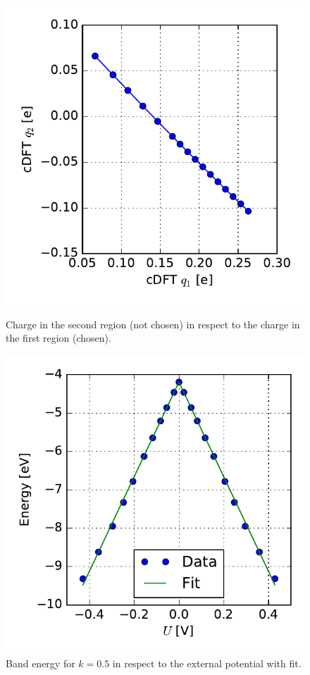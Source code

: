 \begin{figure}
	\centering
	\begin{minipage}{0.49\textwidth}
		\centering
			\includegraphics[width = \textwidth]{Images/Hydrogen/charging/charge_correlation}
			\caption{Charge in the second region (not chosen) in respect to the charge in the first region (chosen).}
			\label{image_charge_correlation}
	
	\end{minipage}\hspace*{.5cm}
	\begin{minipage}{0.49\textwidth}
	\centering
	\includegraphics[width = \textwidth]{Images/Hydrogen/charging/border_energy_q_1}
	\caption{Band energy for $k = 0.5$ in respect to the external potential with fit.}
	\label{image_edge_energy_qs_1}
	\end{minipage}
\end{figure}
